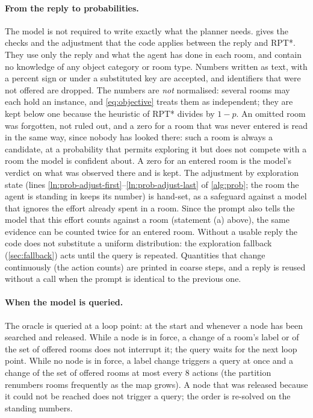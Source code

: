 \documentclass[10pt]{article}
\begin{document}
\paragraph{From the reply to probabilities.} The model is not required to
write exactly what the planner needs.  gives the checks and the
adjustment that the code applies between the reply and RPT*. They use only the
reply and what the agent has done in each room, and contain no knowledge of
any object category or room type. Numbers written as text, with a percent
sign or under a substituted key are accepted, and identifiers that were not
offered are dropped. The numbers are \emph{not} normalised: several rooms may
each hold an instance, and \cref{eq:objective} treats them as independent;
they are kept below one because the heuristic of RPT* divides by $1-p$. An
omitted room was forgotten, not ruled out, and a zero for a room that was never
entered is read in the same way, since nobody has looked there: such a room is
always a candidate, at a probability that permits exploring it but does not
compete with a room the model is confident about. A zero for an entered room
is the model's verdict on what was observed there and is kept. The adjustment
by exploration state (lines \ref{ln:prob-adjust-first}--\ref{ln:prob-adjust-last} of
\cref{alg:prob}; the room the agent is standing in keeps its number) is hand-set, as a safeguard against a
model that ignores the effort already spent in a room. Since the prompt also
tells the model that this effort counts against a room (statement (a) above),
the same evidence can be counted twice for an entered room. Without a usable
reply the code does not substitute a uniform distribution: the exploration
fallback (\cref{sec:fallback}) acts until the query is repeated. Quantities
that change continuously (the action counts) are printed in coarse steps, and
a reply is reused without a call when the prompt is identical to the previous
one.

\paragraph{When the model is queried.} The oracle is queried at a loop
point: at the start and whenever a node has been searched and released.
While a node is in force, a change of a room's label or of the set of offered
rooms does not interrupt it; the query waits for the next loop point. While no
node is in force, a label change triggers a query at once and a change of the
set of offered rooms at most every $8$ actions (the partition renumbers rooms
frequently as the map grows). A node that was released because it could not be
reached does not trigger a query; the order is re-solved on the standing
numbers.
\end{document}
